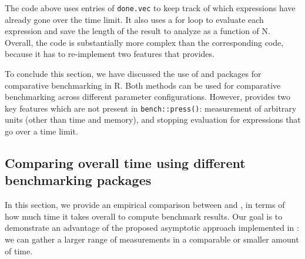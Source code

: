 \begin{Schunk}
\end{Schunk}
The code above uses entries of \verb|done.vec| to keep track of which expressions have already gone over the time limit.
It also uses a for loop to evaluate each expression and save the length of the result to analyze as a function of N.
Overall, the code is substantially more complex than the corresponding  code, because it has to re-implement two features that  provides.

To conclude this section, we have discussed the use of  and  packages for comparative benchmarking in R. 
Both methods can be used for comparative benchmarking across different parameter configurations. 
However,  provides two key features which are not present in \verb|bench::press()|: measurement of arbitrary units (other than time and memory), and stopping evaluation for expressions that go over a time limit.

\subsection{Comparing overall time using different benchmarking packages}

In this section, we provide an empirical comparison between  and , in terms of how much time it takes overall to compute benchmark results.
Our goal is to demonstrate an advantage of the proposed asymptotic approach implemented in : we can gather a larger range of measurements in a comparable or smaller amount of time.

